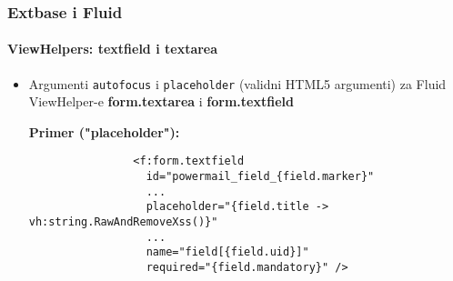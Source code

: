 
\begin{frame}[fragile]
	\frametitle{Extbase i Fluid}
	\framesubtitle{ViewHelpers: textfield i textarea}

	\begin{itemize}
		\item Argumenti \texttt{autofocus} i \texttt{placeholder} (validni HTML5 argumenti) za Fluid ViewHelper-e \textbf{form.textarea} i \textbf{form.textfield}\newline

			\smaller\textbf{Primer ("placeholder"):}\normalsize
			\begin{lstlisting}
				<f:form.textfield
				  id="powermail_field_{field.marker}"
				  ...
				  placeholder="{field.title -> vh:string.RawAndRemoveXss()}"
				  ...
				  name="field[{field.uid}]"
				  required="{field.mandatory}" />
			\end{lstlisting}

	\end{itemize}

\end{frame}


